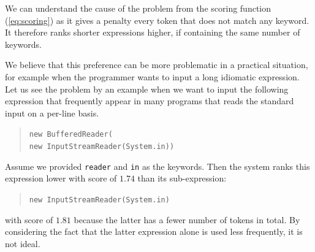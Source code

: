 \documentclass[PRO,english]{ipsj}
\begin{document}
We can understand the cause of the problem from the scoring function (\ref{eq:scoring}) as it gives a penalty every token that does not match any keyword.  It therefore ranks shorter expressions higher, if containing the same number of keywords.  

We believe that this preference can be more problematic in a practical situation, for example when the programmer wants to input a long idiomatic expression.  Let us see the problem by an example when we want to input the following expression that frequently appear in many programs that reads the standard input on a per-line basis.
\begin{quote}
  \texttt{new BufferedReader(\\
    \qquad new InputStreamReader(System.in))}
\end{quote}
Assume we provided \texttt{reader} and \texttt{in} as the keywords.  Then the system ranks this expression lower with score of $1.74$ than its sub-expression:
\begin{quote}
  \texttt{new InputStreamReader(System.in)}
\end{quote}
with score of $1.81$ because the latter has a fewer number of tokens in total.  By considering the fact that the latter expression alone is used less frequently, it is not ideal.  






\end{document}
